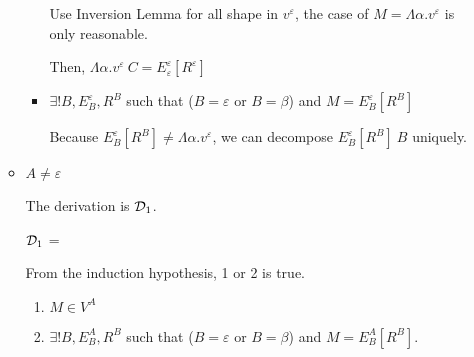 \begin{itemize}
\begin{itemize}
\begin{itemize}
	      	      	      Use Inversion Lemma for all shape in $v^\varepsilon$, the case of $ M = \Lambda\alpha.v^\varepsilon$ is only reasonable.
	      	      	      	      	      	      	      	      	      	      	      	      	      	      	      	      	      	      		      	      	      	      	      	      	      	      	      	      	      	      
	      	      	      Then, $ \Lambda\alpha.v^\varepsilon\ C = E^\varepsilon_\varepsilon [R^\varepsilon]$
	      	      	\item $\exists ! B, E^\varepsilon_B, R^B$ such that ($B = \varepsilon$ or $B = \beta$) and $M = E^\varepsilon_B[R^B]$
	      	      	      	      	      	      	      	      	      	      	      	      	      	      	      	      	      	      		      	      	      	      	      	      	      	      	      	      	      	      
	      	      	      Because $ E^\varepsilon_B[R^B] \neq \Lambda\alpha.v^\varepsilon$, we can decompose $E^\varepsilon_B[R^B]\ B$ uniquely.
	      	      \end{itemize}
	      	      	      	      	      	      	      	      	      	      	      	      		      	      	      	      	      	      	      	      
	      	\item $ A \neq \varepsilon $
	      	      	      	      	      	      	      	      	      	      	      	      		      	      	      	      	      	      	      	      
	      	      The derivation is $\mathcal{D}_1$.
	      	      	      	      	      	      	      	      	      	      	      	      		      	      	      	      	      	      	      	      
	      	      $\mathcal{D}_1$ = 
	      	      {}
	      	      	      	      	      	      	      	      	      	      	      	      		      	      	      	      	      	      	      	      
	      	      From the induction hypothesis, 1 or 2 is true.
	      	      	      	      	      	      	      	      	      	      	      	      		      	      	      	      	      	      	      	      
	      	      \begin{enumerate}
	      	      	\item $ M \in V^A$
	      	      	\item $\exists ! B, E^A_B, R^B$ such that ($B = \varepsilon$ or $B = \beta$) and $M = E^A_B[R^B]$.
	      	      \end{enumerate}
	      	      	      	      	      	      	      	      	      	      	      	      		      	      	      	      	      	      	      	      

\end{itemize}
\end{itemize}
